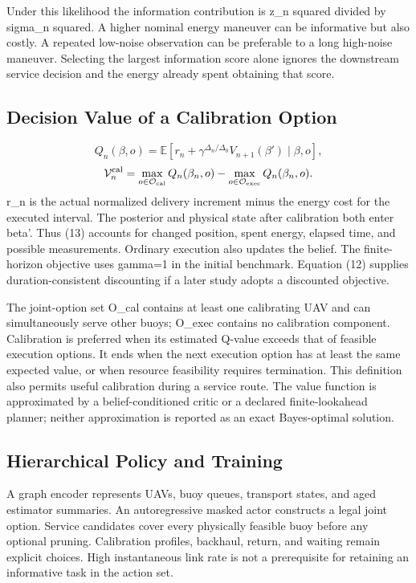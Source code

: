 \documentclass[10pt,twocolumn,letterpaper]{article}
\begin{document}
Under this likelihood the information contribution is z\_n squared divided by sigma\_n squared. A higher nominal energy maneuver can be informative but also costly. A repeated low-noise observation can be preferable to a long high-noise maneuver. Selecting the largest information score alone ignores the downstream service decision and the energy already spent obtaining that score.

\subsection{Decision Value of a Calibration Option}
\begin{equation}
Q_n(\beta,o)=\mathbb E[r_n+\gamma^{\Delta_n/\Delta_0}V_{n+1}(\beta')\mid\beta,o],
\end{equation}
\begin{equation}
\mathcal V_n^{\rm cal}=\max_{o\in\mathcal O_{\rm cal}}Q_n(\beta_n,o)-\max_{o\in\mathcal O_{\rm exec}}Q_n(\beta_n,o).
\end{equation}
r\_n is the actual normalized delivery increment minus the energy cost for the executed interval. The posterior and physical state after calibration both enter beta'. Thus (13) accounts for changed position, spent energy, elapsed time, and possible measurements. Ordinary execution also updates the belief. The finite-horizon objective uses gamma=1 in the initial benchmark. Equation (12) supplies duration-consistent discounting if a later study adopts a discounted objective.

The joint-option set O\_cal contains at least one calibrating UAV and can simultaneously serve other buoys; O\_exec contains no calibration component. Calibration is preferred when its estimated Q-value exceeds that of feasible execution options. It ends when the next execution option has at least the same expected value, or when resource feasibility requires termination. This definition also permits useful calibration during a service route. The value function is approximated by a belief-conditioned critic or a declared finite-lookahead planner; neither approximation is reported as an exact Bayes-optimal solution.

\subsection{Hierarchical Policy and Training}
A graph encoder represents UAVs, buoy queues, transport states, and aged estimator summaries. An autoregressive masked actor constructs a legal joint option. Service candidates cover every physically feasible buoy before any optional pruning. Calibration profiles, backhaul, return, and waiting remain explicit choices. High instantaneous link rate is not a prerequisite for retaining an informative task in the action set.
\end{document}
